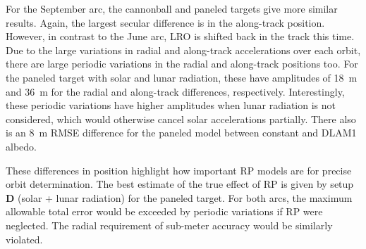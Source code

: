 For the September arc, the cannonball and paneled targets give more similar results. Again, the largest secular difference is in the along-track position. However, in contrast to the June arc, \gls{LRO} is shifted back in the track this time. Due to the large variations in radial and along-track accelerations over each orbit, there are large periodic variations in the radial and along-track positions too. For the paneled target with solar and lunar radiation, these have amplitudes of \qty{18}{\m} and \qty{36}{\m} for the radial and along-track differences, respectively. Interestingly, these periodic variations have higher amplitudes when lunar radiation is not considered, which would otherwise cancel solar accelerations partially. There also is an \qty{8}{m} RMSE difference for the paneled model between constant and \gls{DLAM1} albedo.


These differences in position highlight how important \gls{RP} models are for precise orbit determination. The best estimate of the true effect of \gls{RP} is given by setup $\mathbf{D}$ (solar + lunar radiation) for the paneled target. For both arcs, the maximum allowable total error would be exceeded by periodic variations if \gls{RP} were neglected. The radial requirement of sub-meter accuracy would be similarly violated.





    
%             
    
    
%             

